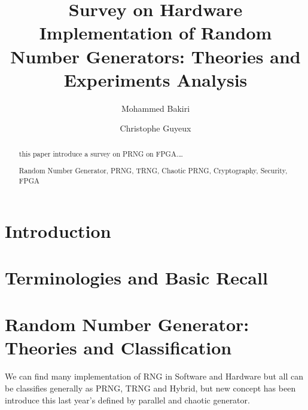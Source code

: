 \documentclass[English, runningheads,a4paper]{llncs}
\newcommand{\keywords}[1]{\par\addvspace\baselineskip
\noindent\keywordname\enspace\ignorespaces#1}
\begin{document}
\mainmatter  %

\title{Survey on Hardware Implementation of Random Number Generators: Theories and Experiments Analysis}


\author{Mohammed Bakiri \and Christophe Guyeux}



\maketitle

\begin{abstract}
this paper introduce a survey on PRNG on FPGA.\dots

\keywords{Random Number Generator, PRNG, TRNG, Chaotic PRNG, Cryptography, Security, FPGA}
\end{abstract}

\section{Introduction}


\section{Terminologies and Basic Recall}


\section{Random Number Generator: Theories and Classification}
We can find many implementation of RNG in Software and Hardware but all can be classifies generally as PRNG, TRNG and  Hybrid,  but new concept has been introduce this last year's defined by parallel and chaotic generator.
\end{document}
